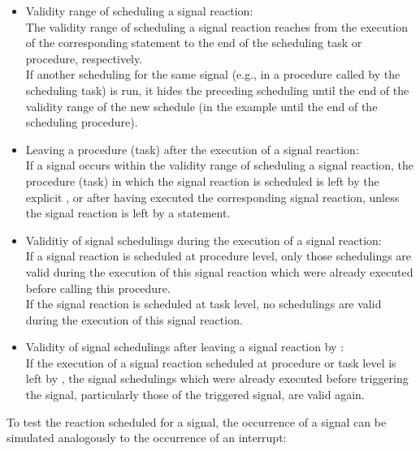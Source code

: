 \begin{itemize}
\item Validity range of scheduling a signal reaction:\\
The validity range of scheduling a signal reaction reaches from the
execution of the corresponding  statement to the end of the
scheduling task or procedure, respectively.\\
If another scheduling for the same signal (e.g., in a procedure called
by the scheduling task) is run, it hides the preceding scheduling until
the end of the validity range of the new schedule (in the example until
the end of the scheduling procedure).
\item Leaving a procedure (task) after the execution of a signal
reaction:\\
If a signal occurs within the validity range of scheduling a signal
reaction, the procedure (task) in which the signal reaction is scheduled
is left by 
the explicit ,  or 
 after having executed the 
corresponding signal reaction, unless the signal reaction is left by a 
 statement.
\item Validitiy of signal schedulings during the execution of a signal
reaction:\\
If a signal reaction is scheduled at procedure level, only those 
schedulings are valid during the execution of this signal reaction which
were already executed before calling this procedure.\\
If the signal reaction is scheduled at task level, no  schedulings are
valid during the execution of this signal reaction.
\item Validity of signal schedulings after leaving a signal reaction by
:\\
If the execution of a signal reaction scheduled at procedure or task
level is left by , the signal schedulings which were already
executed before triggering the signal, particularly those of the
triggered signal, are valid again.
\end{itemize}

To test the reaction scheduled for a signal, the occurrence of a signal
can be simulated analogously to the occurrence of an interrupt:

\begin{grammarframe}
\end{grammarframe}


